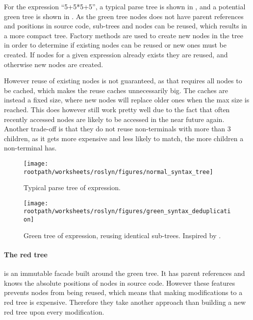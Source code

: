 For the expression ``5+5*5+5'', a typical parse tree is shown in , and a potential green tree is shown in . As the green tree nodes does not have parent references and positions in source code, sub-trees and nodes can be reused, which results in a more compact tree. Factory methods are used to create new nodes in the tree in order to determine if existing nodes can be reused or new ones must be created. If nodes for a given expression already exists they are reused, and otherwise new nodes are created. 

However reuse of existing nodes is not guaranteed, as that requires all nodes to be cached, which makes the reuse caches unnecessarily big. The caches are instead a fixed size, where new nodes will replace older ones when the max size is reached. This does however still work pretty well due to the fact that often recently accessed nodes are likely to be accessed in the near future again\cite{sadovRoslynPerf}. Another trade-off is that they do not reuse non-terminals with more than 3 children, as it gets more expensive and less likely to match, the more children a non-terminal has\cite{sadovRoslynPerf}.

\begin{figure}[htbp]
\centering
 \texttt{[image: \\rootpath/worksheets/roslyn/figures/normal\_syntax\_tree]} 
 \caption{Typical parse tree of expression.}
\label{fig:normal_syntax_tree}
\end{figure}

\begin{figure}[htbp]
\centering
 \texttt{[image: \\rootpath/worksheets/roslyn/figures/green\_syntax\_deduplication]} 
 \caption{Green tree of expression, reusing identical sub-trees. Inspired by \cite{sadovRoslynPerf}.}
\label{fig:green_syntax_deduplication}
\end{figure}

\paragraph{The red tree} is an immutable facade built around the green tree. It has parent references and knows the absolute positions of nodes in source code. However these features prevents nodes from being reused, which means that making modifications to a red tree is expensive. Therefore they take another approach than building a new red tree upon every modification\cite{lippert2012redgreen}. 

